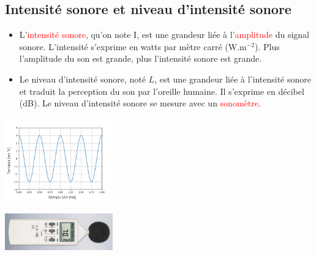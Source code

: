 \subsection{Intensité sonore et niveau d'intensité sonore}
\begin{tcolorbox}[colback=green!5!white,colframe=green!75!black,title=\textbf{Définition :}]
\begin{multicols}{2}
\begin{itemize}[label=\textbullet]
    \item L'\textcolor{red}{intensité sonore}, qu'on note I, est une grandeur liée à l'\textcolor{red}{amplitude} du signal sonore. L'intensité s'exprime en watts par mètre carré (W.m$^{-2}$). Plus l'amplitude du son est grande, plus l'intensité sonore est grande.
    \item Le niveau d'intensité sonore, noté $L$, est une grandeur liée à l'intensité sonore et traduit la perception du son par l'oreille humaine. Il s'exprime en décibel (dB). Le niveau d'intensité sonore se mesure avec un \textcolor{red}{sonomètre}.
    \end{itemize}

\begin{center}
    \includegraphics[width=0.35\textwidth]{Images/Signal_diapason.PNG}
\end{center}
\begin{center}
    \includegraphics[width=0.35\textwidth]{Images/Sonometre.PNG}
\end{center}
\end{multicols}
\end{tcolorbox}

